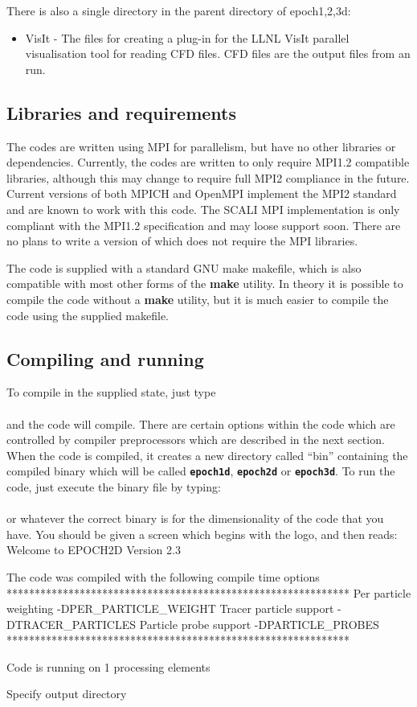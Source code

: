 \documentclass[12pt,a4paper]{article}
\newcommand{\inlinecode}[1]{{\color{warwickred} \bf\texttt{#1}}}
\newcommand{\EPOCH}{{\color{warwickdark}\fontfamily{phv}\selectfont{EPOCH}}}
\newenvironment{boxverbatim}{\lboxverbatim{none}}{\endlboxverbatim}
\begin{document}
There is also a single directory in the parent directory of epoch{1,2,3}d:

\begin{itemize}
\item VisIt - The files for creating a plug-in for the LLNL VisIt parallel
  visualisation tool for reading CFD files. CFD files are the output files
  from an {\EPOCH} run.
\end{itemize}

\subsection{Libraries and requirements}
The {\EPOCH} codes are written using MPI for parallelism, but have no other
libraries or dependencies. Currently, the codes are written to only require
MPI1.2 compatible libraries, although this may change to require full MPI2
compliance in the future. Current versions of both MPICH and OpenMPI implement
the MPI2 standard and are known to work with this code. The SCALI MPI
implementation is only compliant with the MPI1.2 specification and may loose
support soon.
There are no plans to write a version of {\EPOCH} which does not require
the MPI libraries.

The code is supplied with a standard GNU make makefile, which is also
compatible with most other forms of the {\bf make} utility. In theory it is
possible to compile the code without a {\bf make} utility, but it is much
easier to compile the code using the supplied makefile.

\subsection{Compiling and running {\EPOCH}}

To compile {\EPOCH} in the supplied state, just type\\
\indent\inlinecode{make}\\
and the code will compile. There are certain options within the code which are
controlled by compiler preprocessors which are described in the next
section. When the code is compiled, it creates a new directory called ``bin''
containing the compiled binary which will be called \inlinecode{epoch1d},
\inlinecode{epoch2d} or \inlinecode{epoch3d}. To run the code, just execute the
binary file by typing:\\
\indent\inlinecode{./bin/epoch2d}\\
or whatever the correct binary is for the dimensionality of the code that you
have. You should be given a screen which begins with the {\EPOCH} logo, and then
reads:
\begin{boxverbatim}
 Welcome to EPOCH2D Version 2.3

 The code was compiled with the following compile time options
 *************************************************************
 Per particle weighting -DPER_PARTICLE_WEIGHT
 Tracer particle support -DTRACER_PARTICLES
 Particle probe support -DPARTICLE_PROBES
 *************************************************************

 Code is running on 1 processing elements


 Specify output directory
\end{boxverbatim}
\end{document}
